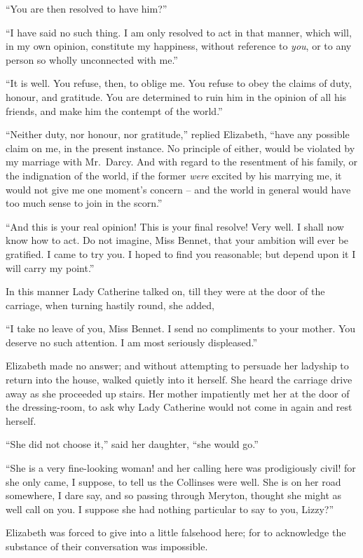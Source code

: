 “You are then resolved to have him?”

“I have said no such thing. I am only resolved to act
in that manner, which will, in my own opinion, constitute
my happiness, without reference to \textit{you}, or to any person
so wholly unconnected with me.”

“It is well. You refuse, then, to oblige me. You refuse
to obey the claims of duty, honour, and gratitude. You
are determined to ruin him in the opinion of all his friends,
and make him the contempt of the world.”

“Neither duty, nor honour, nor gratitude,” replied
Elizabeth, “have any possible claim on me, in the present
instance. No principle of either, would be violated by
my marriage with Mr.\ Darcy. And with regard to the
resentment of his family, or the indignation of the world,
if the former \textit{were} excited by his marrying me, it would
not give me one moment’s concern -- and the world in
general would have too much sense to join in the scorn.”

“And this is your real opinion! This is your final
resolve! Very well. I shall now know how to act. Do
not imagine, Miss Bennet, that your ambition will ever
be gratified. I came to try you. I hoped to find you
reasonable; but depend upon it I will carry my point.”

In this manner Lady Catherine talked on, till they were
at the door of the carriage, when turning hastily round,
she added,

“I take no leave of you, Miss Bennet. I send no compliments
to your mother. You deserve no such attention.
I am most seriously displeased.”

Elizabeth made no answer; and without attempting
to persuade her ladyship to return into the house, walked
quietly into it herself. She heard the carriage drive away
as she proceeded up stairs. Her mother impatiently met
her at the door of the dressing-room, to ask why Lady
Catherine would not come in again and rest herself.

“She did not choose it,” said her daughter, “she
would go.”

“She is a very fine-looking woman! and her calling
here was prodigiously civil! for she only came, I suppose,
to tell us the Collinses were well. She is on her road
somewhere, I dare say, and so passing through Meryton,
thought she might as well call on you. I suppose she had
nothing particular to say to you, Lizzy?”

Elizabeth was forced to give into a little falsehood
here; for to acknowledge the substance of their conversation
was impossible.

